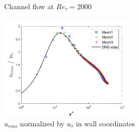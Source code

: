\begin{figure}[h]
\begin{minipage}[b]{0.5\textwidth}
\end{minipage}
%
\begin{minipage}[b]{0.5\textwidth}
\end{minipage}
\caption{Channel flow at $Re_\tau=2000$}
\label{uv_balance}
\end{figure}


\begin{figure}[h!]
    \centering
    \includegraphics[width=0.6\textwidth]{06_Resultsanddiscussion/figur/UDNS_2016/urms_wall_coords.jpg}
    \caption{$u_{rms}$ normalized by $u_\tau$ in wall coordinates}
    \label{urms wall}
\end{figure}

